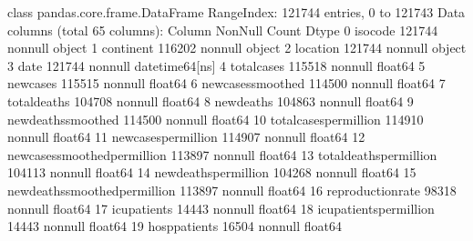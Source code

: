 \documentclass[letterpaper,10pt,english]{jupyterBook}
\begin{document}
\begin{sphinxVerbatim}[commandchars=\\\{\}]
\PYGZlt{}class \PYGZsq{}pandas.core.frame.DataFrame\PYGZsq{}\PYGZgt{}
RangeIndex: 121744 entries, 0 to 121743
Data columns (total 65 columns):
 \PYGZsh{}   Column                                   Non\PYGZhy{}Null Count   Dtype         
\PYGZhy{}\PYGZhy{}\PYGZhy{}  \PYGZhy{}\PYGZhy{}\PYGZhy{}\PYGZhy{}\PYGZhy{}\PYGZhy{}                                   \PYGZhy{}\PYGZhy{}\PYGZhy{}\PYGZhy{}\PYGZhy{}\PYGZhy{}\PYGZhy{}\PYGZhy{}\PYGZhy{}\PYGZhy{}\PYGZhy{}\PYGZhy{}\PYGZhy{}\PYGZhy{}   \PYGZhy{}\PYGZhy{}\PYGZhy{}\PYGZhy{}\PYGZhy{}         
 0   iso\PYGZus{}code                                 121744 non\PYGZhy{}null  object        
 1   continent                                116202 non\PYGZhy{}null  object        
 2   location                                 121744 non\PYGZhy{}null  object        
 3   date                                     121744 non\PYGZhy{}null  datetime64[ns]
 4   total\PYGZus{}cases                              115518 non\PYGZhy{}null  float64       
 5   new\PYGZus{}cases                                115515 non\PYGZhy{}null  float64       
 6   new\PYGZus{}cases\PYGZus{}smoothed                       114500 non\PYGZhy{}null  float64       
 7   total\PYGZus{}deaths                             104708 non\PYGZhy{}null  float64       
 8   new\PYGZus{}deaths                               104863 non\PYGZhy{}null  float64       
 9   new\PYGZus{}deaths\PYGZus{}smoothed                      114500 non\PYGZhy{}null  float64       
 10  total\PYGZus{}cases\PYGZus{}per\PYGZus{}million                  114910 non\PYGZhy{}null  float64       
 11  new\PYGZus{}cases\PYGZus{}per\PYGZus{}million                    114907 non\PYGZhy{}null  float64       
 12  new\PYGZus{}cases\PYGZus{}smoothed\PYGZus{}per\PYGZus{}million           113897 non\PYGZhy{}null  float64       
 13  total\PYGZus{}deaths\PYGZus{}per\PYGZus{}million                 104113 non\PYGZhy{}null  float64       
 14  new\PYGZus{}deaths\PYGZus{}per\PYGZus{}million                   104268 non\PYGZhy{}null  float64       
 15  new\PYGZus{}deaths\PYGZus{}smoothed\PYGZus{}per\PYGZus{}million          113897 non\PYGZhy{}null  float64       
 16  reproduction\PYGZus{}rate                        98318 non\PYGZhy{}null   float64       
 17  icu\PYGZus{}patients                             14443 non\PYGZhy{}null   float64       
 18  icu\PYGZus{}patients\PYGZus{}per\PYGZus{}million                 14443 non\PYGZhy{}null   float64       
 19  hosp\PYGZus{}patients                            16504 non\PYGZhy{}null   float64       

\end{sphinxVerbatim}
\end{document}
